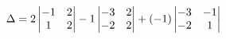 \documentclass[preview]{standalone}
\begin{document}
\begin{align*}
\special{dvisvgm:raw <g id='unique000'>}\Delta = 2\begin{vmatrix}-1 & 2\\ 1 & 2\end{vmatrix} -1\begin{vmatrix}-3 & 2\\ -2 & 2\end{vmatrix} + (-1)\begin{vmatrix}-3 & -1\\ -2 & 1\end{vmatrix}\special{dvisvgm:raw </g>}
\end{align*}
\end{document}
